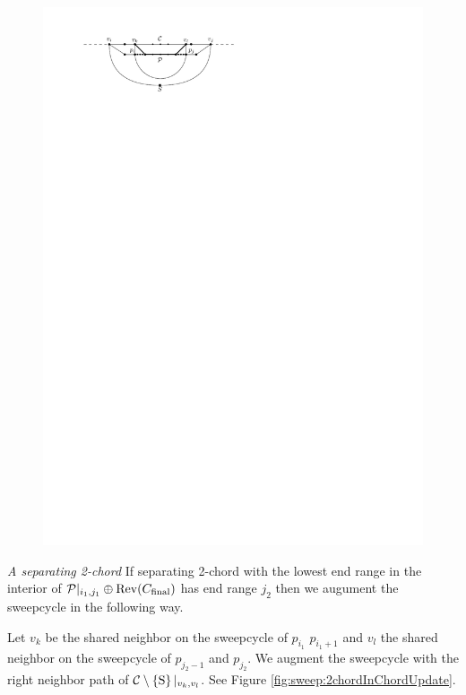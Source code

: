     \begin{figure}[h]
      \centering
      \includegraphics[scale=1]{unifiedAlgo/img/chordUpdate}
      \caption{}
      \label{fig:sweep:chordUpdate}
    \end{figure}

    \emph{A separating 2-chord}
      If separating 2-chord with the lowest end range in the interior of $\mathcal{P}|_{i_1, j_1} \oplus \operatorname{Rev}({C_\text{final}})$ has end range $j_2$ then we augument the sweepcycle in the following way.

      Let $v_k$ be the shared neighbor on the sweepcycle of $p_{i_1}$ $p_{i_1 +1}$ and $v_l$ the shared neighbor on the sweepcycle  of $p_{j_2 -1}$ and $p_{j_2}$. We augment the sweepcycle with the right neighbor path of $\mathcal{C} \setminus \left\lbrace {\mathrm{S}} \right\rbrace|_{v_k, v_l}$. See Figure \ref{fig:sweep:2chordInChordUpdate}.

